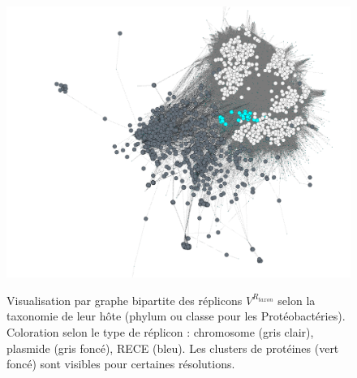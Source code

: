 \begin{landscape}
\begin{figure}
\begin{center}
\begin{minipage}[t]{0.40\textwidth}
\includegraphics[width=\textwidth]{./img/gamma.png}
\label{figgamma}
\end{minipage}
\caption[Visualisation par graphe des réplicons par lignée bactérienne]{Visualisation par graphe bipartite des réplicons $V^{R_{taxon}}$ selon la taxonomie de leur hôte (phylum ou classe pour les Protéobactéries).\\\medskip Coloration selon le type de réplicon : chromosome (gris clair), plasmide (gris foncé), RECE (bleu). Les clusters de protéines (vert foncé) sont visibles pour certaines résolutions.} \label{figgprahe2}
\end{center}
\end{figure}
\end{landscape}


